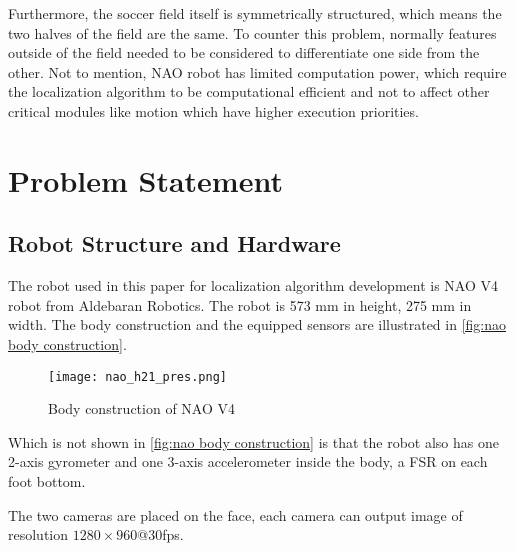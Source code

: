 Furthermore, the soccer field itself is symmetrically structured, which means the two halves of the field are the same. To counter this problem, normally features outside of the field needed to be considered to differentiate one side from the other.
Not to mention,  NAO robot has limited computation power, which require the localization algorithm to be computational efficient and not to affect other critical modules like motion which have higher execution priorities.




\section{Problem Statement}
\subsection{Robot Structure and Hardware}\label{sub:hardware}
The robot used in this paper for localization algorithm development is NAO V4 robot from Aldebaran Robotics. The robot is 573 mm in height, 275 mm in width. The body construction and the equipped sensors are illustrated in \autoref{fig:nao body construction}.

\begin{figure}[h!]
  \centering
  \texttt{[image: nao\_h21\_pres.png]}
  \caption{Body construction of NAO V4}
  \label{fig:nao body construction}
\end{figure}

Which is not shown in \autoref{fig:nao body construction} is that the robot also has one 2-axis gyrometer and one 3-axis accelerometer inside the body, a \gls{FSR} on each foot bottom. 

The two cameras are placed on the face, each camera can output image of resolution $1280 \times 960$@30fps. %


